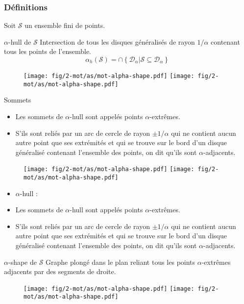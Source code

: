 \begin{frame}
\frametitle{Définitions}
{ Soit $\mathcal{S}$ un ensemble fini de points.
  \begin{block}{$\alpha$-hull de $\mathcal{S}$}
    Intersection de tous les disques généralisés de rayon $1/\alpha$ contenant tous les points de l'ensemble.
    $$ \alpha_h(\mathcal{S}) = \cap \left\{ \mathcal{D}_{\alpha} | \mathcal{S} \subseteq \mathcal{D}_{\alpha} \right\}$$
    \begin{figure}[H]
      \centering
      \texttt{[image: fig/2-mot/as/mot-alpha-shape.pdf]}
      \texttt{[image: fig/2-mot/as/mot-alpha-shape.pdf]}
    \end{figure} 
  \end{block}

  \begin{block}{Sommets}
    \begin{itemize}
      \item Les sommets de $\alpha$-hull sont appelés points $\alpha$-extrêmes.
      \item S'ils sont reliés par un arc de cercle de rayon $\pm 1/ \alpha$ qui ne contient aucun autre point que ses extrémités et qui se trouve sur le bord d'un disque généralisé contenant l'ensemble des points, on dit qu'ils sont $\alpha$-adjacents.
    \end{itemize}
  \end{block}
}
{
  \begin{block}{}
    \vspace{-0.2cm}
    \begin{figure}[H]
      \centering
      \texttt{[image: fig/2-mot/as/mot-alpha-shape.pdf]}
      \texttt{[image: fig/2-mot/as/mot-alpha-shape.pdf]}
    \end{figure} 
    \vspace{-1cm}
    \begin{itemize}
      \item $\alpha$-hull :
      \item Les sommets de $\alpha$-hull sont appelés points $\alpha$-extrêmes.
      \item S'ils sont reliés par un arc de cercle de rayon $\pm 1/ \alpha$ qui ne contient aucun autre point que ses extrémités et qui se trouve sur le bord d'un disque généralisé contenant l'ensemble des points, on dit qu'ils sont $\alpha$-adjacents.
    \end{itemize}
  \end{block}


  \begin{block}{$\alpha$-shape de $\mathcal{S}$}
        Graphe plongé dans le plan reliant tous les points $\alpha$-extrêmes adjacents par des segments de droite.
    \begin{figure}[H]
      \centering
      \texttt{[image: fig/2-mot/as/mot-alpha-shape.pdf]}
      \texttt{[image: fig/2-mot/as/mot-alpha-shape.pdf]}
    \end{figure}
  \end{block}
}
\end{frame}

